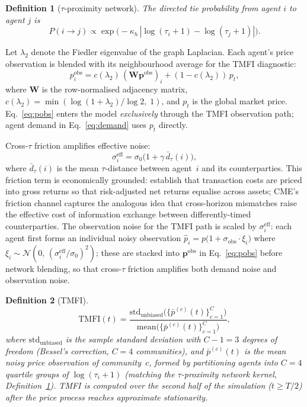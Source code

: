 \documentclass[preprint,12pt,authoryear]{elsarticle}
\newtheorem{definition}{Definition}
\begin{document}
\begin{definition}[$\tau$-proximity network]\label{def:tau-network}
The directed tie probability from agent $i$ to agent $j$ is
\[
  P(i \to j) \propto
  \exp\!\bigl(-\kappa_h\,|\log(\tau_i+1)-\log(\tau_j+1)|\bigr).
\]
\end{definition}

Let $\lambda_2$ denote the Fiedler eigenvalue of the graph Laplacian.
Each agent's price observation is blended with its neighbourhood average
for the TMFI diagnostic:
\begin{equation}
  p^{\mathrm{obs}}_i
    = c(\lambda_2)\,(\mathbf{W}\mathbf{p}^{\mathrm{obs}})_i
    + (1-c(\lambda_2))\,p_t,
  \label{eq:pobs}
\end{equation}
where $\mathbf{W}$ is the row-normalised adjacency matrix,
$c(\lambda_2) = \min(\log(1+\lambda_2)/\log 2,\;1)$,
and $p_t$ is the global market price.
Eq.~\eqref{eq:pobs} enters the model \emph{exclusively} through the TMFI
observation path; agent demand in Eq.~\eqref{eq:demand} uses $p_t$
directly.

Cross-$\tau$ friction amplifies effective noise:
\begin{equation}
  \sigma_i^{\mathrm{eff}} = \sigma_0\bigl(1 + \gamma\,\bar{d}_\tau(i)\bigr),
  \label{eq:sigeff}
\end{equation}
where $\bar{d}_\tau(i)$ is the mean $\tau$-distance between agent~$i$ and
its counterparties.
This friction term is economically grounded: \citet{amihud1986} establish
that transaction costs are priced into gross returns so that risk-adjusted
net returns equalise across assets; CME's friction channel captures the
analogous idea that cross-horizon mismatches raise the effective cost of
information exchange between differently-timed counterparties.
The observation noise for the TMFI path is scaled by $\sigma_i^{\mathrm{eff}}$:
each agent first forms an individual noisy observation
$\hat{p}_i = p\bigl(1 + \sigma_{\mathrm{obs}} \cdot \xi_i\bigr)$
where $\xi_i \sim \mathcal{N}(0,\,(\sigma_i^{\mathrm{eff}}/\sigma_0)^2)$;
these are stacked into $\mathbf{p}^{\mathrm{obs}}$ in Eq.~\eqref{eq:pobs}
before network blending,
so that cross-$\tau$ friction amplifies both demand noise and observation noise.

\begin{definition}[TMFI]\label{def:tmfi}
\[
  \mathrm{TMFI}(t) =
    \frac{\mathrm{std}_{\mathrm{unbiased}}\bigl(\{\bar{p}^{(c)}(t)\}_{c=1}^{C}\bigr)}%
         {\mathrm{mean}\bigl(\{\bar{p}^{(c)}(t)\}_{c=1}^{C}\bigr)},
\]
where $\mathrm{std}_{\mathrm{unbiased}}$ is the sample standard deviation
with $C - 1 = 3$ degrees of freedom (Bessel's correction, $C = 4$ communities),
and $\bar{p}^{(c)}(t)$ is the mean noisy price observation of community~$c$,
formed by partitioning agents into $C = 4$ quartile groups of
$\log(\tau_i+1)$ (matching the $\tau$-proximity network kernel, Definition~\ref{def:tau-network}).
TMFI is computed over the second half of the simulation ($t \geq T/2$)
after the price process reaches approximate stationarity.
\end{definition}
\end{document}
